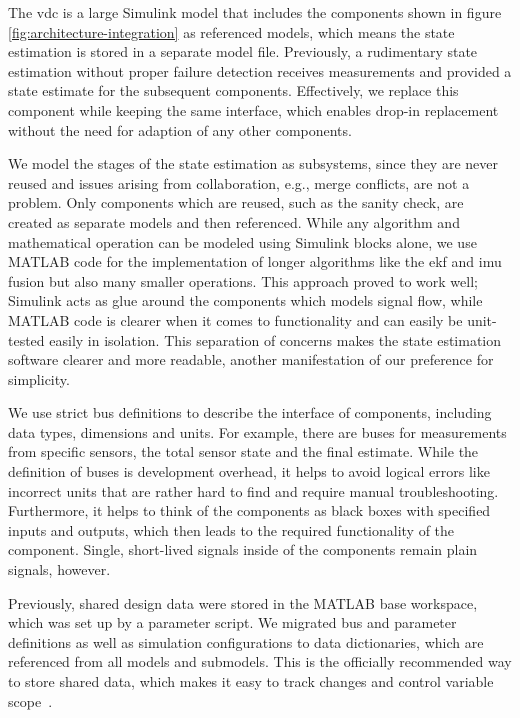 The \gls{vdc} is a large Simulink model that includes the components shown in figure \ref{fig:architecture-integration} as referenced models, which means the state estimation is stored in a separate model file. Previously, a rudimentary state estimation without proper failure detection receives measurements and provided a state estimate for the subsequent components. Effectively, we replace this component while keeping the same interface, which enables drop-in replacement without the need for adaption of any other components.

We model the stages of the state estimation as subsystems, since they are never reused and issues arising from collaboration, e.g., merge conflicts, are not a problem. Only components which are reused, such as the sanity check, are created as separate models and then referenced. While any algorithm and mathematical operation can be modeled using Simulink blocks alone, we use MATLAB code for the implementation of longer algorithms like the \gls{ekf} and \gls{imu} fusion but also many smaller operations. This approach proved to work well; Simulink acts as glue around the components which models signal flow, while MATLAB code is clearer when it comes to functionality and can easily be unit-tested easily in isolation. This separation of concerns makes the state estimation software clearer and more readable, another manifestation of our preference for simplicity.

We use strict bus definitions to describe the interface of components, including data types, dimensions and units. For example, there are buses for measurements from specific sensors, the total sensor state and the final estimate. While the definition of buses is development overhead, it helps to avoid logical errors like incorrect units that are rather hard to find and require manual troubleshooting. Furthermore, it helps to think of the components as black boxes with specified inputs and outputs, which then leads to the required functionality of the component. Single, short-lived signals inside of the components remain plain signals, however.

Previously, shared design data were stored in the MATLAB base workspace, which was set up by a parameter script. We migrated bus and parameter definitions as well as simulation configurations to data dictionaries, which are referenced from all models and submodels. This is the officially recommended way to store shared data, which makes it easy to track changes and control variable scope~\cite{TheMathWorksInc..2020b}.

